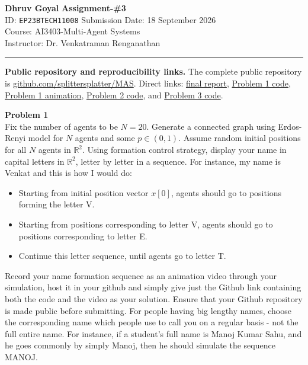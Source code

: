 \documentclass[a4paper,11pt]{article}
\newenvironment{problem}[1]
    {\begin{mdframed}[backgroundcolor=gray!20]\textbf{Problem #1}\\}
    {\end{mdframed}}
\newcommand{\R}{\mathbb{R}}
\newcommand{\repoURL}{https://github.com/splittersplatter/MAS}
\begin{document}
\noindent
\large\textbf{Dhruv Goyal} \hfill \textbf{Assignment-\#3}\\[2pt]
ID: \texttt{EP23BTECH11008} \hfill Submission Date: 18 September 2026\\[1pt]
\normalsize Course: AI3403-Multi-Agent Systems\\[1pt]
Instructor: Dr. Venkatraman Renganathan\\
\noindent\rule{\textwidth}{2.8pt}

\begin{mdframed}[backgroundcolor=blue!4,linecolor=blue!45!black]
\textbf{Public repository and reproducibility links.}
The complete public repository is \href{\repoURL}{github.com/splittersplatter/MAS}.
Direct links: \href{\repoURL/blob/main/Assignment_3_Solution.pdf}{final report},
\href{\repoURL/blob/main/Assignment_3_Problem_1.py}{Problem 1 code},
\href{\repoURL/blob/main/assets/p1_DHRUV_formation.gif}{Problem 1 animation},
\href{\repoURL/blob/main/Assignment_3_Problem_2.py}{Problem 2 code}, and
\href{\repoURL/blob/main/Assignment_3_Problem_3.py}{Problem 3 code}.
\end{mdframed}

\begin{problem}{1}
Fix the number of agents to be $N = 20$. Generate a connected graph using Erdos-Renyi model for
$N$ agents and some $p \in (0, 1)$. Assume random initial positions for all $N$ agents in $\R^2$.
Using formation control strategy, display your name in capital letters in $\R^2$, letter by letter
in a sequence. For instance, my name is Venkat and this is how I would do:
\begin{itemize}
\item Starting from initial position vector $x[0]$, agents should go to positions forming the letter V.
\item Starting from positions corresponding to letter V, agents should go to positions corresponding
to letter E.
\item Continue this letter sequence, until agents go to letter T.
\end{itemize}
Record your name formation sequence as an animation video through your simulation, host it in your
github and simply give just the Github link containing both the code and the video as your solution.
Ensure that your Github repository is made public before submitting. For people having big lengthy
names, choose the corresponding name which people use to call you on a regular basis - not the full
entire name. For instance, if a student's full name is Manoj Kumar Sahu, and he goes commonly by
simply Manoj, then he should simulate the sequence MANOJ.
\end{problem}
\end{document}
